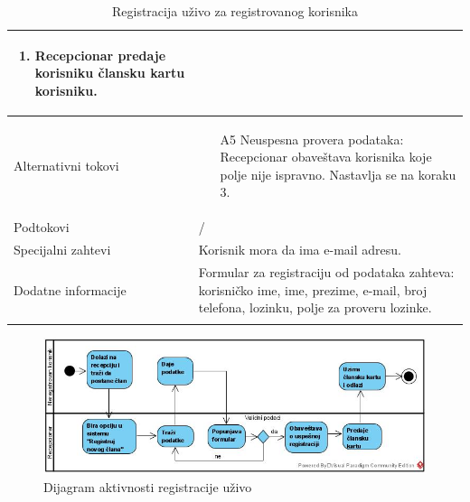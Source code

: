 \documentclass[../main.tex]{subfiles}
\begin{document}
\begin{longtable}{| p{} | p{} |}
\begin{enumerate}
        \item Recepcionar predaje korisniku člansku kartu korisniku.
    \end{enumerate}\\
\hline
    Alternativni tokovi & \begin{itemize}
        \item[A5] Neuspesna provera podataka: Recepcionar obaveštava korisnika koje polje nije ispravno. Nastavlja se na koraku 3.
    \end{itemize}\\
\hline
    Podtokovi & /\\
\hline
    Specijalni zahtevi & Korisnik mora da ima e-mail adresu.\\
\hline
    Dodatne informacije & Formular za registraciju od podataka zahteva: korisničko ime, ime, prezime, e-mail, broj telefona, lozinku, polje za proveru lozinke.\\
\hline
\caption{Registracija uživo za registrovanog korisnika} %
\end{longtable}


\begin{figure}[!ht]
\begin{center}
\includegraphics[scale=0.55]{sections/images/Dijagram_aktivnsti_registracije_uzivo.jpg}
\end{center}
\caption{Dijagram aktivnosti registracije uživo}
\label{fig:kontekst}
\end{figure}
\end{document}
